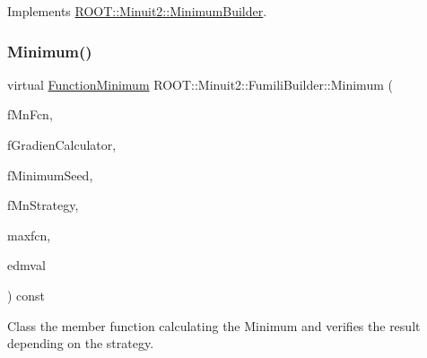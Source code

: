 Implements \mbox{\hyperlink{classROOT_1_1Minuit2_1_1MinimumBuilder_aefaa624436afa8195af1f3393a35981f}{R\+O\+O\+T\+::\+Minuit2\+::\+Minimum\+Builder}}.

\mbox{\label{classROOT_1_1Minuit2_1_1FumiliBuilder_aa1889039835b4117cb2a9b7d49e4f6dd}} 
\subsubsection{\texorpdfstring{Minimum()}{Minimum()}\hspace{0.1cm}{\footnotesize\ttfamily [3/6]}}
{\footnotesize\ttfamily virtual \mbox{\hyperlink{classROOT_1_1Minuit2_1_1FunctionMinimum}{Function\+Minimum}} R\+O\+O\+T\+::\+Minuit2\+::\+Fumili\+Builder\+::\+Minimum (\begin{DoxyParamCaption}\item[{const \mbox{\hyperlink{classROOT_1_1Minuit2_1_1MnFcn}{Mn\+Fcn}} \&}]{f\+Mn\+Fcn,  }\item[{const \mbox{\hyperlink{classROOT_1_1Minuit2_1_1GradientCalculator}{Gradient\+Calculator}} \&}]{f\+Gradien\+Calculator,  }\item[{const \mbox{\hyperlink{classROOT_1_1Minuit2_1_1MinimumSeed}{Minimum\+Seed}} \&}]{f\+Minimum\+Seed,  }\item[{const \mbox{\hyperlink{classROOT_1_1Minuit2_1_1MnStrategy}{Mn\+Strategy}} \&}]{f\+Mn\+Strategy,  }\item[{unsigned int}]{maxfcn,  }\item[{double}]{edmval }\end{DoxyParamCaption}) const\hspace{0.3cm}{\ttfamily [virtual]}}

Class the member function calculating the Minimum and verifies the result depending on the strategy.


